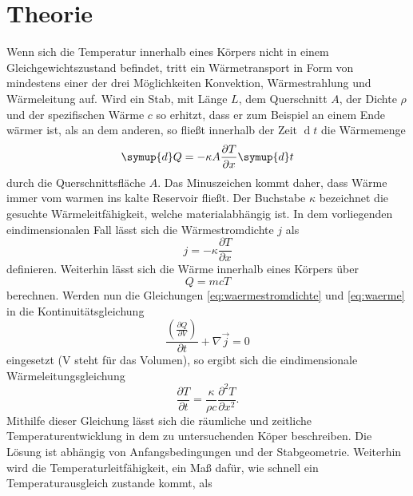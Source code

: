 \section{Theorie}
\label{sec:Theorie}

Wenn sich die Temperatur innerhalb eines Körpers nicht in einem Gleichgewichtszustand
befindet, tritt ein Wärmetransport in Form von mindestens einer der drei Möglichkeiten 
Konvektion, Wärmestrahlung und Wärmeleitung auf.
Wird ein Stab, mit Länge $L$, dem Querschnitt $A$, der Dichte $\rho$ und der spezifischen 
Wärme $c$ so erhitzt, dass er zum Beispiel an einem Ende wärmer ist, als an dem anderen, so 
fließt innerhalb der Zeit $\operatorname{d}t$ die Wärmemenge 
\begin{equation}
    \symup{d}Q = -\kappa A \frac{\partial T}{\partial x} \symup{d}t
\end{equation}
\noindent durch die Querschnittsfläche $A$. Das Minuszeichen kommt daher, dass Wärme immer
vom warmen ins kalte Reservoir fließt. Der Buchstabe $\kappa$ bezeichnet die
gesuchte Wärmeleitfähigkeit, welche materialabhängig ist. In dem vorliegenden eindimensionalen 
Fall lässt sich die Wärmestromdichte $j$ als
\begin{equation}
    j = - \kappa \frac{\partial T}{\partial x}
    \label{eq:waermestromdichte}
\end{equation}
\noindent definieren. Weiterhin lässt sich die Wärme innerhalb eines Körpers über \cite{sample2}
\begin{equation}
    Q = m c T 
    \label{eq:waerme}
\end{equation}
\noindent berechnen. Werden nun die Gleichungen \ref{eq:waermestromdichte} und \ref{eq:waerme}
in die Kontinuitätsgleichung 
\begin{equation}
    \frac{\left( \frac{\partial Q}{\partial V} \right) }{\partial t} + \nabla \vec{j} = 0
\end{equation}
\noindent eingesetzt (V steht für das Volumen), so ergibt sich die eindimensionale 
Wärmeleitungsgleichung
\begin{equation}
    \frac{\partial T}{\partial t} = \frac{\kappa}{\rho c} \frac{\partial^2 T}{\partial x^2}.
\end{equation}
\noindent Mithilfe dieser Gleichung lässt sich die räumliche und zeitliche Temperaturentwicklung 
in dem zu untersuchenden Köper beschreiben. Die Lösung ist abhängig von Anfangsbedingungen 
und der Stabgeometrie. Weiterhin wird die Temperaturleitfähigkeit, ein Maß
dafür, wie schnell ein Temperaturausgleich zustande kommt, als
